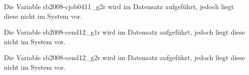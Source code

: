 \documentclass[a4paper]{article}
\begin{document}
				

				

				

		Die Variable sb2008-cjob0411\_g2r wird im Datensatz aufgeführt, jedoch liegt diese nicht im System vor.

				

				

				

				

				

				

				

		Die Variable sb2008-cend12\_g1r wird im Datensatz aufgeführt, jedoch liegt diese nicht im System vor.

		Die Variable sb2008-cend12\_g2r wird im Datensatz aufgeführt, jedoch liegt diese nicht im System vor.

				

				

				

				

				

				

				

				

				

				

				

				

				

				

				

				

				

				
\end{document}

